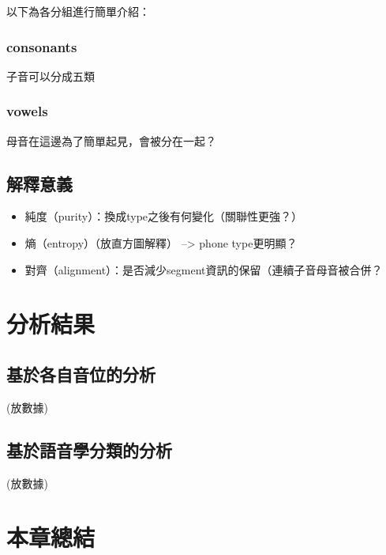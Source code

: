 以下為各分組進行簡單介紹：

\subsubsection{consonants}

子音可以分成五類

\subsubsection{vowels}

母音在這邊為了簡單起見，會被分在一起？

\subsection{解釋意義}

\begin{itemize}
    \item 純度（purity）：換成type之後有何變化（關聯性更強？）
    \item 熵（entropy）（放直方圖解釋） --> phone type更明顯？
    \item 對齊（alignment）：是否減少segment資訊的保留（連續子音母音被合併？
\end{itemize}


\section{分析結果}
 
\subsection{基於各自音位的分析}

(放數據)

\subsection{基於語音學分類的分析}

(放數據)

\section{本章總結}
